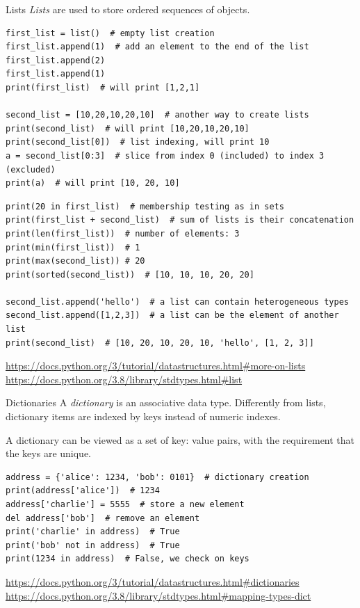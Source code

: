 \documentclass[aspectratio=169,]{beamer}
\begin{document}
\begin{frame}{Lists}
    \emph{Lists} are used to store \alert{ordered sequences} of objects.

        \begin{verbatim}
first_list = list()  # empty list creation
first_list.append(1)  # add an element to the end of the list
first_list.append(2)
first_list.append(1)
print(first_list)  # will print [1,2,1]

second_list = [10,20,10,20,10]  # another way to create lists
print(second_list)  # will print [10,20,10,20,10]
print(second_list[0])  # list indexing, will print 10
a = second_list[0:3]  # slice from index 0 (included) to index 3 (excluded)
print(a)  # will print [10, 20, 10]
        \end{verbatim}

        \framebreak
        \begin{verbatim}
print(20 in first_list)  # membership testing as in sets
print(first_list + second_list)  # sum of lists is their concatenation
print(len(first_list))  # number of elements: 3
print(min(first_list))  # 1
print(max(second_list)) # 20
print(sorted(second_list))  # [10, 10, 10, 20, 20]

second_list.append('hello')  # a list can contain heterogeneous types
second_list.append([1,2,3])  # a list can be the element of another list
print(second_list)  # [10, 20, 10, 20, 10, 'hello', [1, 2, 3]]
        \end{verbatim}

        \footnotesize{
            \url{https://docs.python.org/3/tutorial/datastructures.html#more-on-lists}
            \url{https://docs.python.org/3.8/library/stdtypes.html#list}
        }
\end{frame}

\begin{frame}[fragile]{Dictionaries}
    A \emph{dictionary} is an associative data type.
    Differently from lists, dictionary items are indexed by \alert{keys} instead of numeric indexes.

    A dictionary can be viewed as a set of \alert{key: value} pairs, with the requirement that the keys are unique.

        \begin{verbatim}
address = {'alice': 1234, 'bob': 0101}  # dictionary creation
print(address['alice'])  # 1234
address['charlie'] = 5555  # store a new element
del address['bob']  # remove an element
print('charlie' in address)  # True
print('bob' not in address)  # True
print(1234 in address)  # False, we check on keys
        \end{verbatim}

        \footnotesize{
    \url{https://docs.python.org/3/tutorial/datastructures.html#dictionaries}
    \url{https://docs.python.org/3.8/library/stdtypes.html#mapping-types-dict}
}
\end{frame}
\end{document}

